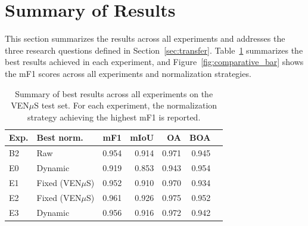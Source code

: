 \section{Summary of Results}
\label{sec:comparative_analysis}

This section summarizes the results across all experiments and addresses the three research questions defined in Section~\ref{sec:transfer}. Table~\ref{tab:comparative} summarizes the best results achieved in each experiment, and Figure~\ref{fig:comparative_bar} shows the mF1 scores across all experiments and normalization strategies.

\begin{table}[H]
\centering
\caption[Summary of best results across all experiments.]{Summary of best 
results across all experiments on the VEN$\mu$S test set. For each experiment, 
the normalization strategy achieving the highest mF1 is reported.}
\label{tab:comparative}
\small
\begin{tabular}{llrrrrr}
\toprule
\textbf{Exp.} & \textbf{Best norm.} & \textbf{mF1} & \textbf{mIoU} & \textbf{OA} & \textbf{BOA} \\
\midrule
B2 & Raw              & 0.954 & 0.914 & 0.971 & 0.945 \\
E0 & Dynamic          & 0.919 & 0.853 & 0.943 & 0.954 \\
E1 & Fixed (VEN$\mu$S)& 0.952 & 0.910 & 0.970 & 0.934 \\
E2 & Fixed (VEN$\mu$S)& 0.961 & 0.926 & 0.975 & 0.952 \\
E3 & Dynamic          & 0.956 & 0.916 & 0.972 & 0.942 \\
\bottomrule
\end{tabular}
\end{table}


